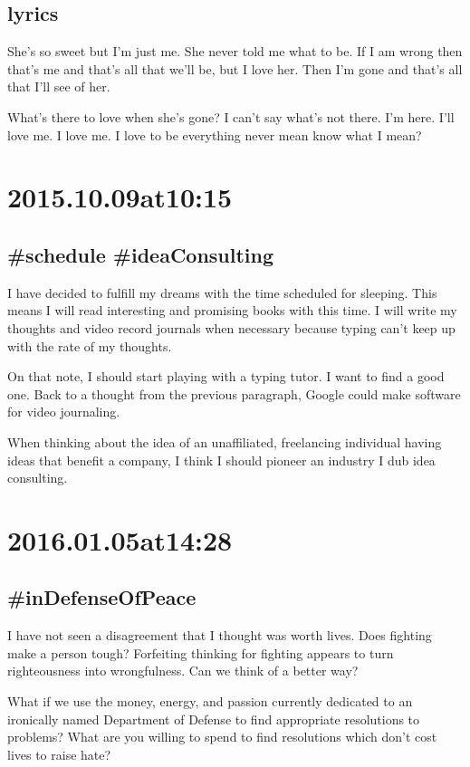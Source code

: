 \subsection*{lyrics}
She's so sweet but I'm just me.
She never told me what to be.
If I am wrong then that's me and that's all that we'll be, but I love her.
Then I'm gone and that's all that I'll see of her.

What's there to love when she's gone?
I can't say what's not there.
I'm here.
I'll love me.
I love me.
I love to be
everything
never mean
know what I mean?

\section*{2015.10.09at10:15}
\subsection*{ \#schedule \#ideaConsulting }
I have decided to fulfill my dreams with the time scheduled for sleeping. This means I will read interesting and promising books with this time. I will write my thoughts and video record journals when necessary because typing can't keep up with the rate of my thoughts.

On that note, I should start playing with a typing tutor. I want to find a good one. Back to a thought from the previous paragraph, Google could make software for video journaling.

When thinking about the idea of an unaffiliated, freelancing individual having ideas that benefit a company, I think I should pioneer an industry I dub idea consulting.

\section*{ 2016.01.05at14:28 }
\subsection*{ \#inDefenseOfPeace }

I have not seen a disagreement that I thought was worth lives. Does fighting make a person tough? Forfeiting thinking for fighting appears to turn righteousness into wrongfulness. Can we think of a better way?

What if we use the money, energy, and passion currently dedicated to an ironically named Department of Defense to find appropriate resolutions to problems? What are you willing to spend to find resolutions which don't cost lives to raise hate?

